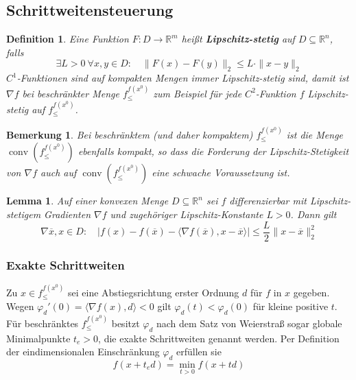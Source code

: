 \documentclass[11pt]{scrreprt}
\newcounter{thm}
\numberwithin{thm}{section}
\newtheorem{bemerkung}[thm]{Bemerkung}
\newtheorem{lemma}[thm]{Lemma}
\newtheorem*{definition*}{Definition}
\begin{document}
\subsection*{Schrittweitensteuerung}

\begin{definition*}
	Eine Funktion $F \colon D \rightarrow \mathbb{R}^m$ heißt \textbf{Lipschitz-stetig} auf $D \subseteq \mathbb{R}^n$, falls
	$$ \exists L > 0 ~\forall x, y \in D: \quad \| F(x) - F(y) \|_2 \leq L \cdot \| x - y \|_2 $$
	$C^1$-Funktionen sind auf kompakten Mengen immer Lipschitz-stetig sind, damit ist $\nabla f$ bei beschränkter Menge $f_{\leq}^{f(x^0)}$ zum Beispiel für jede $C^2$-Funktion $f$ Lipschitz-stetig auf $f_{\leq}^{f(x^0)}$.
\end{definition*}

\setcounter{thm}{11}

\begin{bemerkung}
	Bei beschränktem (und daher kompaktem) $f_{\leq}^{f(x^0)}$ ist die Menge $\operatorname{conv}(f_{\leq}^{f(x^0)})$ ebenfalls kompakt, so dass die Forderung der Lipschitz-Stetigkeit von $\nabla f$ auch auf $\operatorname{conv}(f_{\leq}^{f(x^0)})$ eine schwache Voraussetzung ist.	
\end{bemerkung}

\begin{lemma}
	Auf einer konvexen Menge $D \subseteq \mathbb{R}^n$ sei $f$ differenzierbar mit Lipschitz-stetigem Gradienten $\nabla f$ und zugehöriger Lipschitz-Konstante $L > 0$. Dann gilt
	$$ \nabla \overline{x}, x \in D: \quad \left| f(x) - f(\overline{x})- \langle \nabla f(\overline{x}), x - \overline{x} \rangle \right| \leq \frac{L}{2} \| x - \overline{x} \|_2^2 $$
\end{lemma}

\subsubsection*{Exakte Schrittweiten}

Zu $x \in f_{\leq}^{f(x^0)}$ sei eine Abstiegsrichtung erster Ordnung $d$ für $f$ in $x$ gegeben. Wegen $\varphi_d'(0) = \langle \nabla f(x), d \rangle < 0$ gilt $\varphi_d(t) < \varphi_d(0)$ für kleine positive $t$. Für beschränktes $f_{\leq}^{f(x^0)}$ besitzt $\varphi_d$ nach dem Satz von Weierstraß sogar globale Minimalpunkte $t_e> 0$, die exakte Schrittweiten genannt werden. Per Definition der eindimensionalen Einschränkung $\varphi_d$ erfüllen sie
$$ f(x + t_e d) = \min_{t > 0} f(x + td) $$
\end{document}
